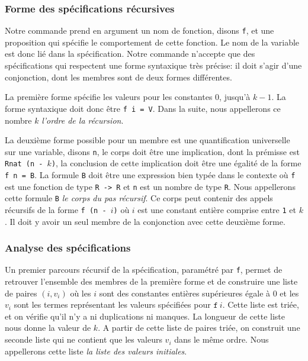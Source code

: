 \documentclass{modjflart}
\begin{document}
\subsubsection{Forme des spécifications récursives}
Notre commande prend en argument un nom de fonction, disons \texttt{f},
et une
proposition qui spécifie le comportement de cette fonction.  Le nom de
la variable est donc lié dans la spécification.  Notre
commande n'accepte que des spécifications qui respectent une forme
syntaxique très précise: il doit s'agir d'une conjonction, dont les
membres sont de deux formes différentes.

La première forme spécifie
les valeurs pour les constantes \(0\), jusqu'à \(k - 1\).  La forme
syntaxique doit donc être \texttt{f i = V}.  Dans la suite, nous
appellerons ce nombre \(k\) {\em l'ordre de la récursion}.

La deuxième forme possible
pour un membre est une quantification universelle sur une variable,
disons \texttt{n}, le corps doit être une implication, dont la prémisse
est \texttt{Rnat (n - \(k\))}, la conclusion de cette implication doit être
une égalité de la forme \texttt{f n = B}.  La formule \texttt{B} doit être
une expression bien typée dans le contexte où \texttt{f} est une fonction
de type \texttt{R -> R} et \texttt{n} est un nombre de type \texttt{R}.
Nous appellerons cette formule \texttt{B} {\em le corps du pas récursif}.
Ce corps peut contenir des appels récursifs de
la forme \texttt{f (n - \(i\))} où \(i\) est une constant entière comprise
  entre \texttt{1} et \(k\).  Il doit y avoir un seul membre de la
  conjonction avec cette deuxième forme.

\subsubsection{Analyse des spécifications}
Un premier parcours récursif de la spécification, paramétré par
\texttt{f}, permet de retrouver l'ensemble des membres de la première forme
et de construire une liste de paires \((i, v_i)\) où les \(i\) sont des
constantes entières supérieures égale à 0 et les \(v_i\) sont les
termes représentant les valeurs spécifiées pour \(\texttt{f}~i\).  Cette
liste est triée, et on vérifie qu'il n'y a ni duplications ni manques.
La longueur de cette liste nous donne la valeur de \(k\).  A partir
de cette liste de paires triée, on construit une seconde liste qui ne
contient que les valeurs \(v_i\) dans le même ordre.  Nous appellerons
cette liste {\em la liste des valeurs initiales}.
\end{document}
